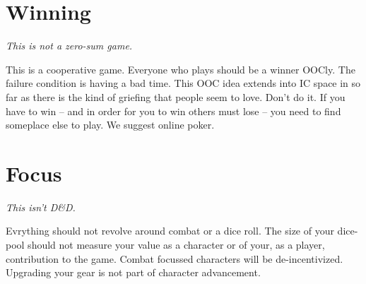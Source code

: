 \section{Winning}
{\em This is not a zero-sum game.}

This is a cooperative game.
Everyone who plays should be a winner OOCly.
The failure condition is having a bad time.
This OOC idea extends into IC space in so far as there is the kind of griefing that people seem to love.
Don't do it. 
If you have to win -- and in order for you to win others must lose -- you need to find someplace else to play.
We suggest online poker.
\section{Focus}
{\em This isn't D\&D.}

Evrything should not revolve around combat or a dice roll.
The size of your dice-pool should not measure your value as a character or of your, as a player, contribution to the game.
Combat focussed characters will be de-incentivized.
Upgrading your gear is not part of character advancement.

